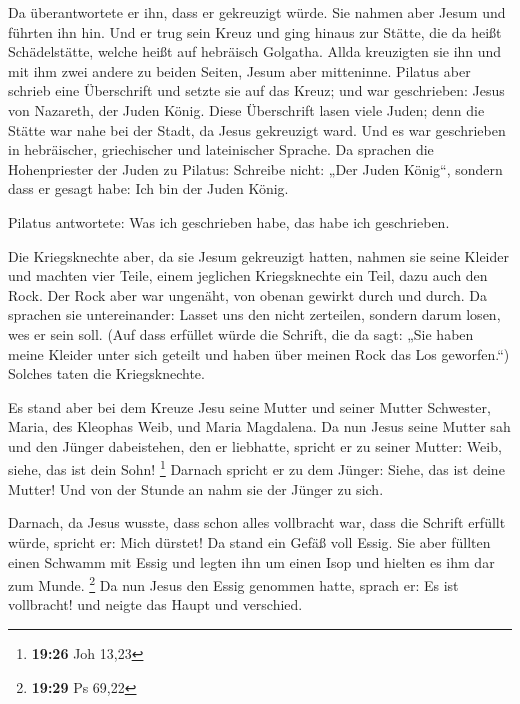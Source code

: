  Da überantwortete er ihn, dass er gekreuzigt würde. Sie
nahmen aber Jesum und führten ihn hin.  Und er trug sein
Kreuz und ging hinaus zur Stätte, die da heißt Schädelstätte, welche
heißt auf hebräisch Golgatha.  Allda kreuzigten sie ihn
und mit ihm zwei andere zu beiden Seiten, Jesum aber mitteninne.
 Pilatus aber schrieb eine Überschrift und setzte sie auf
das Kreuz; und war geschrieben: Jesus von Nazareth, der Juden König.
 Diese Überschrift lasen viele Juden; denn die Stätte war
nahe bei der Stadt, da Jesus gekreuzigt ward. Und es war geschrieben in
hebräischer, griechischer und lateinischer Sprache.  Da
sprachen die Hohenpriester der Juden zu Pilatus: Schreibe nicht: „Der
Juden König``, sondern dass er gesagt habe: Ich bin der Juden König.

 Pilatus antwortete: Was ich geschrieben habe, das habe
ich geschrieben.

 Die Kriegsknechte aber, da sie Jesum gekreuzigt hatten,
nahmen sie seine Kleider und machten vier Teile, einem jeglichen
Kriegsknechte ein Teil, dazu auch den Rock. Der Rock aber war ungenäht,
von obenan gewirkt durch und durch.  Da sprachen sie
untereinander: Lasset uns den nicht zerteilen, sondern darum losen, wes
er sein soll. (Auf dass erfüllet würde die Schrift, die da sagt: „Sie
haben meine Kleider unter sich geteilt und haben über meinen Rock das
Los geworfen.``) Solches taten die Kriegsknechte.

 Es stand aber bei dem Kreuze Jesu seine Mutter und
seiner Mutter Schwester, Maria, des Kleophas Weib, und Maria Magdalena.
 Da nun Jesus seine Mutter sah und den Jünger
dabeistehen, den er liebhatte, spricht er zu seiner Mutter: Weib, siehe,
das ist dein Sohn! \footnote{\textbf{19:26} Joh 13,23} 
Darnach spricht er zu dem Jünger: Siehe, das ist deine Mutter! Und von
der Stunde an nahm sie der Jünger zu sich.

 Darnach, da Jesus wusste, dass schon alles vollbracht
war, dass die Schrift erfüllt würde, spricht er: Mich dürstet!
 Da stand ein Gefäß voll Essig. Sie aber füllten einen
Schwamm mit Essig und legten ihn um einen Isop und hielten es ihm dar
zum Munde. \footnote{\textbf{19:29} Ps 69,22}  Da nun
Jesus den Essig genommen hatte, sprach er: Es ist vollbracht! und neigte
das Haupt und verschied.

